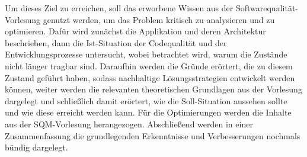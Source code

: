 Um dieses Ziel zu erreichen, soll das erworbene Wissen aus der Softwarequalität-Vorlesung genutzt werden, 
um das Problem kritisch zu analysieren und zu optimieren. 
Dafür wird zunächst die Applikation und deren Architektur beschrieben, 
dann die Ist-Situation der Codequalität und der Entwicklungsprozesse untersucht, 
wobei betrachtet wird, warum die Zustände nicht länger tragbar sind. 
Daraufhin werden die Gründe erörtert, die zu diesem Zustand geführt haben, 
sodass nachhaltige Lösungsstrategien entwickelt werden können, 
weiter werden die relevanten theoretischen Grundlagen aus der Vorlesung dargelegt
und schließlich damit erörtert, wie 
die Soll-Situation aussehen sollte und wie diese erreicht werden kann. 
Für die Optimierungen werden die Inhalte aus der SQM-Vorlesung herangezogen. 
Abschließend werden in einer Zusammenfassung die grundlegenden Erkenntnisse und Verbesserungen nochmals bündig dargelegt.



